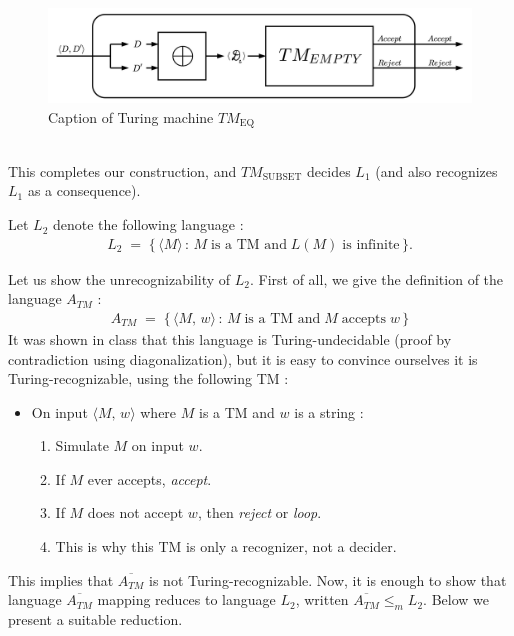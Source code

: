 \documentclass{article}
\begin{document}
\begin{figure}[ht] %
\centering
\includegraphics[scale=0.145]{images/tm eq.jpeg}
\caption{Caption of Turing machine $TM_{\text{EQ}}$}
\label{fig:my_label2}
\end{figure}

\noindent \\This completes our construction, and $TM_{\text{SUBSET}}$ decides $L_1$ (and also recognizes $L_1$ as a consequence).



\newpage
Let $L_2$ denote the following language :
\begin{align*}
    L_2\; =\;\{\,\langle M\rangle\,:\,M\;\text{is a TM and}\;L(M)\;\text{is infinite}\,\}.
\end{align*}

Let us show the unrecognizability of $L_2$.
First of all, we give the definition of the language $A_{TM}$ :
\begin{align*}
    A_{TM}\;=\;\{\,\langle M,\,w\rangle\,:\,M\;\text{is a TM and}\;M\;\text{accepts}\;w\,\} 
\end{align*}
It was shown in class that this language is Turing-undecidable (proof by contradiction using diagonalization), but it is easy to convince ourselves it is Turing-recognizable, using the following TM :

\begin{itemize}
\item [] On input $\langle M,\,w\rangle$ where $M$ is a TM and $w$ is a string :
    \begin{enumerate}
        \item Simulate $M$ on input $w$.
        \item If $M$ ever accepts, \textit{accept}. 
        \item If $M$ does not accept $w$, then \textit{reject} or \textit{loop}.
        \item This is why this TM is only a recognizer, not a decider.
    \end{enumerate}
\end{itemize}
This implies that $\overline{A_{TM}}$ is not Turing-recognizable.
Now, it is enough to show that language $\overline{A_{TM}}$ mapping reduces to language $L_2$, written $\overline{A_{TM}}\le_m L_2$. Below we present a suitable reduction.
\end{document}
